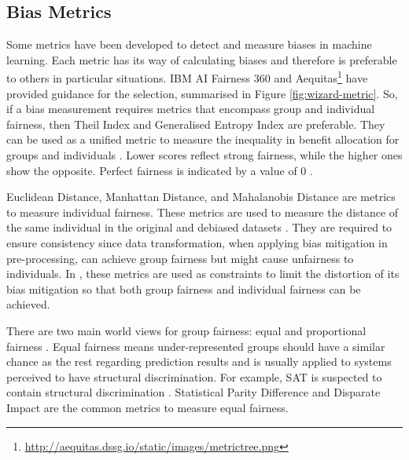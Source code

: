 \documentclass[sigconf,review]{acmart}
\begin{document}
	\subsection{Bias Metrics}
	\label{sec:bias_metrics}	
	Some metrics have been developed to detect and measure biases in machine learning. Each metric has its way of calculating biases and therefore is preferable to others in particular situations. IBM AI Fairness 360 \cite{mahoney2020ai,ibmaif3602022guidance} and Aequitas\footnote{\url{http://aequitas.dssg.io/static/images/metrictree.png}} have provided guidance for the selection, summarised in Figure \ref{fig:wizard-metric}. So, if a bias measurement requires metrics that encompass group and individual fairness, then Theil Index \cite{conceicao2000theyoung,bellamy2018ai} and Generalised Entropy Index \cite{speicher2018unified} are preferable. They can be used as a unified metric to measure the inequality in benefit allocation for groups and individuals \cite{ibmaif3602022guidance,mahoney2020ai}. Lower scores reflect strong fairness, while the higher ones show the opposite. Perfect fairness is indicated by a value of 0 \cite{lale2022doc}. 
	
	Euclidean Distance, Manhattan Distance, and Mahalanobis Distance are metrics to measure individual fairness. These metrics are used to measure the distance of the same individual in the original and debiased datasets \cite{bellamy2018ai}. They are required to ensure consistency since data transformation, when applying bias mitigation in pre-processing, can achieve group fairness but might cause unfairness to individuals. In \cite{calmon2017optimized},   these metrics are used as constraints to limit the distortion of its bias mitigation so that both group fairness and individual fairness can be achieved. 
	
	There are two main world views for group fairness: equal and proportional fairness \cite{mahoney2020ai,ibmaif3602022guidance}. Equal fairness means under-represented groups should have a similar chance as the rest regarding prediction results and is usually applied to systems perceived to have structural discrimination. For example, SAT is suspected to contain structural discrimination \cite{mahoney2020ai,ibmaif3602022guidance}. Statistical Parity Difference \cite{dwork2012fairness,mahoney2020ai,ibmaif3602022guidance} and Disparate Impact \cite{feldman2015disparate,mahoney2020ai,ibmaif3602022guidance} are the common metrics to measure equal fairness. 
	
\end{document}
